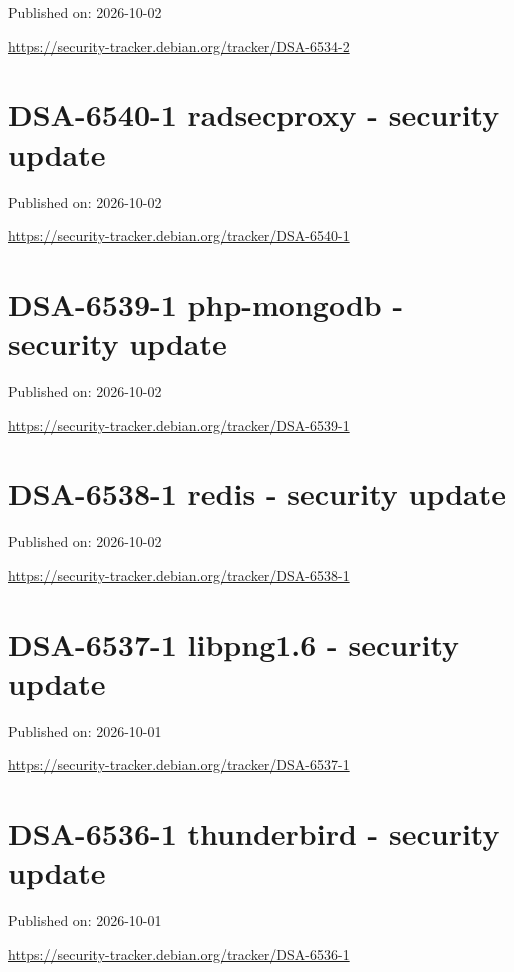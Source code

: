 \documentclass[11pt,a4paper]{article}
\begin{document}
Published on: 2026-10-02

\href{https://security-tracker.debian.org/tracker/DSA-6534-2}{https://security-tracker.debian.org/tracker/DSA-6534-2}

\section{DSA-6540-1 radsecproxy - security update}

Published on: 2026-10-02

\href{https://security-tracker.debian.org/tracker/DSA-6540-1}{https://security-tracker.debian.org/tracker/DSA-6540-1}

\section{DSA-6539-1 php-mongodb - security update}

Published on: 2026-10-02

\href{https://security-tracker.debian.org/tracker/DSA-6539-1}{https://security-tracker.debian.org/tracker/DSA-6539-1}

\section{DSA-6538-1 redis - security update}

Published on: 2026-10-02

\href{https://security-tracker.debian.org/tracker/DSA-6538-1}{https://security-tracker.debian.org/tracker/DSA-6538-1}

\section{DSA-6537-1 libpng1.6 - security update}

Published on: 2026-10-01

\href{https://security-tracker.debian.org/tracker/DSA-6537-1}{https://security-tracker.debian.org/tracker/DSA-6537-1}

\section{DSA-6536-1 thunderbird - security update}

Published on: 2026-10-01

\href{https://security-tracker.debian.org/tracker/DSA-6536-1}{https://security-tracker.debian.org/tracker/DSA-6536-1}
\end{document}
